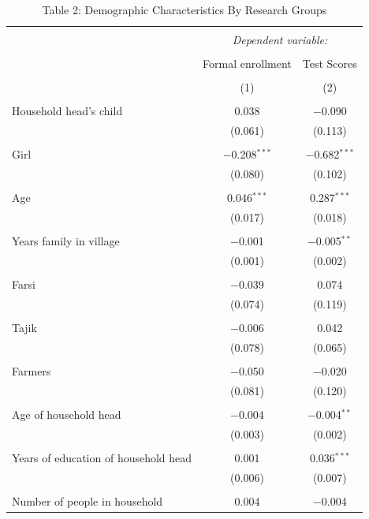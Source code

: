 \documentclass[
]{article}
\begin{document}
\begin{table}[!htbp] \centering 
  \caption{Table 2: Demographic Characteristics By Research Groups} 
  \label{} 
\begin{tabular}{@{\extracolsep{5pt}}lcc} 
\\[-1.8ex]\hline 
\hline \\[-1.8ex] 
 & \multicolumn{2}{c}{\textit{Dependent variable:}} \\ 
\cline{2-3} 
\\[-1.8ex] & Formal enrollment & Test Scores \\ 
\\[-1.8ex] & (1) & (2)\\ 
\hline \\[-1.8ex] 
 Household head's child & 0.038 & $-$0.090 \\ 
  & (0.061) & (0.113) \\ 
  & & \\ 
 Girl & $-$0.208$^{***}$ & $-$0.682$^{***}$ \\ 
  & (0.080) & (0.102) \\ 
  & & \\ 
 Age & 0.046$^{***}$ & 0.287$^{***}$ \\ 
  & (0.017) & (0.018) \\ 
  & & \\ 
 Years family in village & $-$0.001 & $-$0.005$^{**}$ \\ 
  & (0.001) & (0.002) \\ 
  & & \\ 
 Farsi & $-$0.039 & 0.074 \\ 
  & (0.074) & (0.119) \\ 
  & & \\ 
 Tajik & $-$0.006 & 0.042 \\ 
  & (0.078) & (0.065) \\ 
  & & \\ 
 Farmers & $-$0.050 & $-$0.020 \\ 
  & (0.081) & (0.120) \\ 
  & & \\ 
 Age of household head & $-$0.004 & $-$0.004$^{**}$ \\ 
  & (0.003) & (0.002) \\ 
  & & \\ 
 Years of education of household head & 0.001 & 0.036$^{***}$ \\ 
  & (0.006) & (0.007) \\ 
  & & \\ 
 Number of people in household & 0.004 & $-$0.004 \\ 

\end{tabular}
\end{table}
\end{document}
